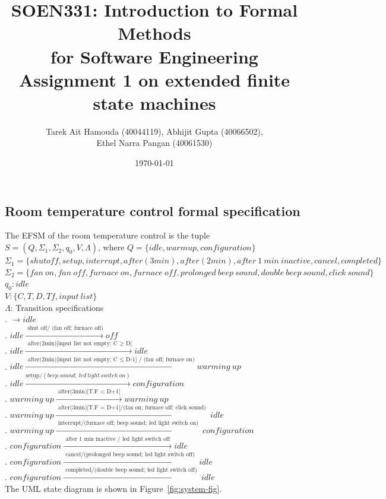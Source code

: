 \documentclass[12pt]{article}
\title{SOEN331: Introduction to Formal Methods\\for Software Engineering\\
Assignment 1 on extended finite state machines}
\author{Tarek Ait Hamouda (40044119), Abhijit Gupta (40066502),\\ 
Ethel Narra Pangan (40061530)}
\date{\today}
\begin{document}
\begin{spacing}{1.5}

\maketitle

\section{Room temperature control formal specification}

\noindent The EFSM of the room temperature control is the tuple $S = (Q, \Sigma_1, \Sigma_2, q_0, V, \Lambda)$, where
\noindent $Q = \{idle, warm up, configuration\}$\\
\noindent $\Sigma_1 = \{shut off, setup, interrupt, after(3min), after(2min), after~1~min~inactive, cancel, completed\}$\\
\noindent $\Sigma_2 = \{fan~on, fan~off, furnace~on, furnace~off, prolonged~beep~sound, double~beep~sound, click~sound\}$\\
\noindent $q_0: idle$\\
\noindent $V: \{C, T, D, Tf, input~list\}$\\
\noindent $\Lambda$: Transition specifications\\
. $\rightarrow idle$\\
. $idle \xrightarrow {\text { shut off/ (fan off; furnace off)}} off$\\
. $idle \xrightarrow {\text { after(2min)[input list not empty; C $\geq$ D]}} idle$\\
. $idle \xrightarrow {\text { after(2min)[input list not empty; C $\leq$ D-1] / (fan off; furnace on)}} warming~up$\\
. $idle \xrightarrow {\text {setup}/(beep~sound;~led~light~switch~on)} configuration$\\
. $warming~up \xrightarrow {\text { after(3min)[T.F $<$ D+1] }} warming~up$\\
. $warming~up \xrightarrow {\text { after(3min)[T.F $=$ D+1]/(fan on; furnace off; click sound) }} idle$\\
. $warming~up \xrightarrow {\text { interrupt/(furnace off; beep sound; led light switch on)  }} configuration$\\
. $configuration \xrightarrow {\text { after 1 min inactive / led light switch off }} idle$\\
. $configuration \xrightarrow {\text { cancel/(prolonged beep sound; led light switch off) }} idle$\\
. $configuration \xrightarrow {\text { completed/(double beep sound; led light switch off) }} idle$\\
\noindent The UML state diagram is shown in Figure~\ref{fig:system-fig}.\\\\


\end{spacing}
\end{document}
